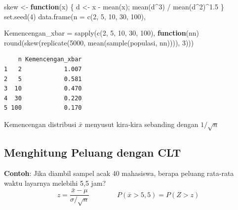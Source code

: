 \documentclass[
  indonesian,
  letterpaper,
]{book}
\newenvironment{Shaded}{\begin{snugshade}}{\end{snugshade}}
\newcommand{\AttributeTok}[1]{\textcolor[rgb]{0.40,0.45,0.13}{#1}}
\newcommand{\ControlFlowTok}[1]{\textcolor[rgb]{0.00,0.23,0.31}{\textbf{#1}}}
\newcommand{\DecValTok}[1]{\textcolor[rgb]{0.68,0.00,0.00}{#1}}
\newcommand{\FloatTok}[1]{\textcolor[rgb]{0.68,0.00,0.00}{#1}}
\newcommand{\FunctionTok}[1]{\textcolor[rgb]{0.28,0.35,0.67}{#1}}
\newcommand{\NormalTok}[1]{\textcolor[rgb]{0.00,0.23,0.31}{#1}}
\newcommand{\OtherTok}[1]{\textcolor[rgb]{0.00,0.23,0.31}{#1}}
\newcommand{\SpecialCharTok}[1]{\textcolor[rgb]{0.37,0.37,0.37}{#1}}
\begin{document}
\begin{Shaded}
\begin{Highlighting}[]
\NormalTok{skew }\OtherTok{\textless{}{-}} \ControlFlowTok{function}\NormalTok{(x) \{ d }\OtherTok{\textless{}{-}}\NormalTok{ x }\SpecialCharTok{{-}} \FunctionTok{mean}\NormalTok{(x); }\FunctionTok{mean}\NormalTok{(d}\SpecialCharTok{\^{}}\DecValTok{3}\NormalTok{) }\SpecialCharTok{/} \FunctionTok{mean}\NormalTok{(d}\SpecialCharTok{\^{}}\DecValTok{2}\NormalTok{)}\SpecialCharTok{\^{}}\FloatTok{1.5}\NormalTok{ \}}
\FunctionTok{set.seed}\NormalTok{(}\DecValTok{4}\NormalTok{)}
\FunctionTok{data.frame}\NormalTok{(}\AttributeTok{n =} \FunctionTok{c}\NormalTok{(}\DecValTok{2}\NormalTok{, }\DecValTok{5}\NormalTok{, }\DecValTok{10}\NormalTok{, }\DecValTok{30}\NormalTok{, }\DecValTok{100}\NormalTok{),}

\AttributeTok{Kemencengan\_xbar =} \FunctionTok{sapply}\NormalTok{(}\FunctionTok{c}\NormalTok{(}\DecValTok{2}\NormalTok{, }\DecValTok{5}\NormalTok{, }\DecValTok{10}\NormalTok{, }\DecValTok{30}\NormalTok{, }\DecValTok{100}\NormalTok{), }\ControlFlowTok{function}\NormalTok{(nn)}
\FunctionTok{round}\NormalTok{(}\FunctionTok{skew}\NormalTok{(}\FunctionTok{replicate}\NormalTok{(}\DecValTok{5000}\NormalTok{, }\FunctionTok{mean}\NormalTok{(}\FunctionTok{sample}\NormalTok{(populasi, nn)))), }\DecValTok{3}\NormalTok{)))}
\end{Highlighting}
\end{Shaded}

\begin{verbatim}
    n Kemencengan_xbar
1   2            1.007
2   5            0.581
3  10            0.470
4  30            0.220
5 100            0.170
\end{verbatim}

Kemencengan distribusi \(\bar{x}\) menyusut kira-kira sebanding dengan
\(1/\sqrt{n}\)

\subsection{Menghitung Peluang dengan
CLT}\label{menghitung-peluang-dengan-clt}

\textbf{Contoh}: Jika diambil sampel acak 40 mahasiswa, berapa peluang
rata-rata waktu layarnya melebihi 5,5 jam?
\[z = \frac{\bar{x} - \mu}{\sigma / \sqrt{n}} \qquad\qquad P(\bar{x} > 5{,}5) = P(Z > z)\]
\end{document}
